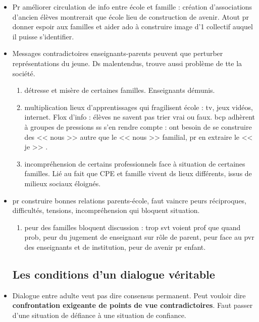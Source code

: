 \documentclass[12pt]{report}
\begin{document}
\begin{itemize}
\vspace{0.5cm}

\item Pr améliorer circulation de info entre école et famille : création d'associations d'ancien élèves montrerait que école lieu de construction de avenir. Atout pr donner espoir aux familles et aider ado à construire image d'1 collectif auquel il puisse s'identifier.\\

\item Messages contradictoires enseignants-parents peuvent que perturber représentations du jeune. Ds malentendus, trouve aussi problème de tte la société.
\begin{enumerate}
\item détresse et misère de certaines familles. Enseignants démunis.\\
\item multiplication lieux d'apprentissages qui fragilisent école : tv, jeux vidéos, internet. Flox d'info : élèves ne savent pas trier vrai ou faux. bcp adhèrent à groupes de pressions ss s'en rendre compte : ont besoin de se construire des << nous >> autre que le << nous >> familial, pr en extraire le << je >> . \\
\item incompréhension de certains professionnels face à situation de certaines familles. Lié au fait que CPE et famille vivent ds lieux différents, issus de milieux sociaux éloignés.\\
\end{enumerate}

\item pr construire bonnes relations parents-école, faut vaincre peurs réciproques, difficultés, tensions, incompréhension qui bloquent situation.
\begin{enumerate}
\item peur des familles bloquent discussion : trop svt voient prof que quand prob, peur du jugement de enseignant sur rôle de parent, peur face au pvr des enseignants et de institution, peur de avenir pr enfant.\\
\end{enumerate}

\subsection{Les conditions d'un dialogue véritable}


\item Dialogue entre adulte veut pas dire consensus permanent. Peut vouloir dire \textbf{confrontation exigeante de points de vue contradictoires}. Faut passer d'une situation de défiance à une situation de confiance.


\end{itemize}
\end{document}
